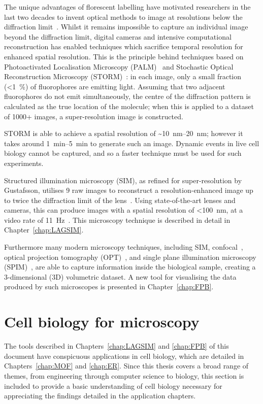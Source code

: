 The unique advantages of florescent labelling have motivated researchers in the last two decades to invent optical methods to image at resolutions below the diffraction limit~\cite{cornea2014fluorescence}.
Whilst it remains impossible to capture an individual image beyond the diffraction limit, digital cameras and intensive computational reconstruction has enabled techniques which sacrifice temporal resolution for enhanced spatial resolution.
This is the principle behind techniques based on Photoactivated Localisation Microscopy (PALM)~\cite{betzig2006imaging} and Stochastic Optical Reconstruction Microscopy (STORM)~\cite{rust2006sub}: in each image, only a small fraction (<\SI{1}{\percent}) of fluorophores are emitting light.
Assuming that two adjacent fluorophores do not emit simultaneously, the centre of the diffraction pattern is calculated as the true location of the molecule; when this is applied to a dataset of \num{1000}+ images, a super-resolution image is constructed. 

STORM is able to achieve a spatial resolution of \textasciitilde\SIrange[range-phrase=--]{10}{20}{\nano\metre}; however it takes around \SIrange[range-phrase=--]{1}{5}{\minute} to generate such an image.
Dynamic events in live cell biology cannot be captured, and so a faster technique must be used for such experiments. 

Structured illumination microscopy (SIM), as refined for super-resolution by Gustafsson, utilises 9 raw images to reconstruct a resolution-enhanced image up to twice the diffraction limit of the lens~\cite{gustafsson2000surpassing}.
Using state-of-the-art lenses and cameras, this can produce images with a spatial resolution of <\SI{100}{\nano\metre}, at a video rate of \SI{11}{\hertz}~\cite{young2016guide}.  
This microscopy technique is described in detail in Chapter~\ref{chap:LAGSIM}. 

Furthermore many modern microscopy techniques, including SIM, confocal~\cite{white1987evaluation, marvin1961microscopy}, optical projection tomography (OPT)~\cite{sharpe2002optical}, and single plane illumination microscopy (SPIM)~\cite{huisken2004optical}, are able to capture information inside the biological sample, creating a 3-dimensional (3D) volumetric dataset. 
A new tool for visualising the data produced by such microscopes is presented in Chapter~\ref{chap:FPB}. 


\section{Cell biology for microscopy}
The tools described in Chapters~\ref{chap:LAGSIM} and \ref{chap:FPB} of this document have conspicuous applications in cell biology, which are detailed in Chapters~\ref{chap:MOF} and \ref{chap:ER}.
Since this thesis covers a broad range of themes, from engineering through computer science to biology, this section is included to provide a basic understanding of cell biology necessary for appreciating the findings detailed in the application chapters. 

